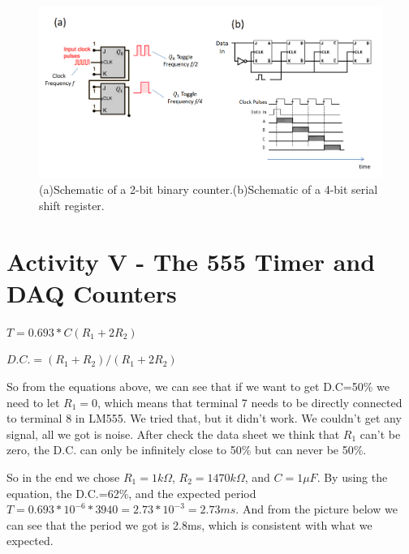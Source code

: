 \documentclass[11pt]{article}
\begin{document}
\begin{figure}[H]
 \begin{center}
  \includegraphics[width=\linewidth/2]{act4_6}
  \caption{(a)Schematic of a 2-bit binary counter.(b)Schematic of a 4-bit serial shift register.}
  \label{fig:act4_6}
 \end{center}
\end{figure}

\section{Activity V - The 555 Timer and DAQ Counters}

$T=0.693*C(R_{1}+2R_{2})$

$D.C.=(R_{1}+R_{2})/(R_{1}+2R_{2})$

So from the equations above, we can see that if we want to get D.C=50\% we need to let $R_{1}=0$, which means that terminal 7 needs to be directly connected to terminal 8 in LM555. We tried that, but it didn't work. We couldn't get any signal, all we got is noise. After check the data sheet we think that $R_{1}$ can't be zero, the D.C. can only be infinitely close to 50\% but can never be 50\%. 

So in the end we chose $R_{1}=1k\Omega$, $R_{2}=1470k\Omega$, and $C=1\mu F$. By using the equation, the D.C.=62\%, and the expected period $T=0.693*10^{-6}*3940=2.73*10^{-3}=2.73ms$. And from the picture below we can see that the period we got is 2.8ms, which is consistent with what we expected.
\end{document}
